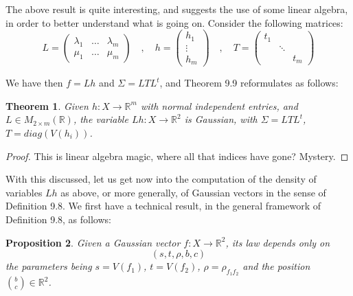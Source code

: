 \documentclass[12pt]{amsbook}
\newtheorem{theorem}{Theorem}[chapter]
\newtheorem{proposition}[theorem]{Proposition}
\begin{document}
The above result is quite interesting, and suggests the use of some linear algebra, in order to better understand what is going on. Consider the following matrices:
$$L=\begin{pmatrix}\lambda_1&\ldots&\lambda_m\\
\mu_1&\ldots&\mu_m\end{pmatrix}
\quad,\quad 
h=\begin{pmatrix}
h_1\\
\vdots\\
h_m\end{pmatrix}\quad,\quad 
T=\begin{pmatrix}
t_1\\
&\ddots\\
&&t_m
\end{pmatrix}$$

We have then $f=Lh$ and $\Sigma=LTL^t$, and Theorem 9.9 reformulates as follows:

\begin{theorem}
Given $h:X\to\mathbb R^m$ with normal independent entries, and $L\in M_{2\times m}(\mathbb R)$, the variable $Lh:X\to\mathbb R^2$ is Gaussian, with $\Sigma=LTL^t$, $T=diag(V(h_i))$.
\end{theorem}

\begin{proof}
This is linear algebra magic, where all that indices have gone? Mystery.
\end{proof}

With this discussed, let us get now into the computation of the density of variables $Lh$ as above, or more generally, of Gaussian vectors in the sense of Definition 9.8. We first have a technical result, in the general framework of Definition 9.8, as follows:

\begin{proposition}
Given a Gaussian vector $f:X\to\mathbb R^2$, its law depends only on
$$(s,t,\rho,b,c)$$
the parameters being $s=V(f_1)$, $t=V(f_2)$, $\rho=\rho_{f_1f_2}$ and the position $\binom{b}{c}\in\mathbb R^2$.
\end{proposition}
\end{document}
